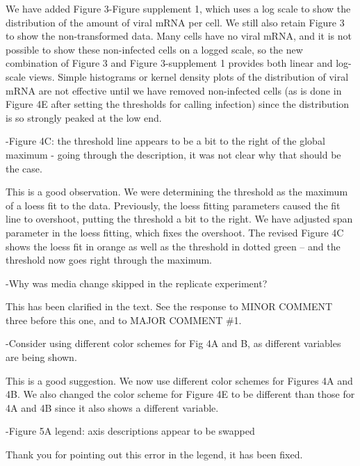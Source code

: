 \documentclass[11pt, oneside]{article}   	%
\begin{document}
{\color{black} 
We have added Figure 3-Figure supplement 1, which uses a log scale to show the distribution of the amount of viral mRNA per cell.
We still also retain Figure 3 to show the non-transformed data.
Many cells have no viral mRNA, and it is not possible to show these non-infected cells on a logged scale, so the new combination of Figure 3 and Figure 3-supplement 1 provides both linear and log-scale views.
Simple histograms or kernel density plots of the distribution of viral mRNA are not effective until we have removed non-infected cells (as is done in Figure 4E after setting the thresholds for calling infection) since the distribution is so strongly peaked at the low end.
}

-Figure 4C: the threshold line appears to be a bit to the right of the global maximum - going through the description, it was not clear why that should be the case. 

{\color{black} 
This is a good observation. 
We were determining the threshold as the maximum of a loess fit to the data. 
Previously, the loess fitting parameters caused the fit line to overshoot, putting the threshold a bit to the right.
We have adjusted span parameter in the loess fitting, which fixes the overshoot.
The revised Figure 4C shows the loess fit in orange as well as the threshold in dotted green -- and the threshold now goes right through the maximum.
}

-Why was media change skipped in the replicate experiment? 

{\color{black} 
This has been clarified in the text.
See the response to MINOR COMMENT three before this one, and to MAJOR COMMENT \#1.}

-Consider using different color schemes for Fig 4A and B, as different variables are being shown. 

{\color{black} 
This is a good suggestion.
We now use different color schemes for Figures 4A and 4B.
We also changed the color scheme for Figure 4E to be different than those for 4A and 4B since it also shows a different variable.}

-Figure 5A legend: axis descriptions appear to be swapped

{\color{black}
Thank you for pointing out this error in the legend, it has been fixed.
}
\end{document}
